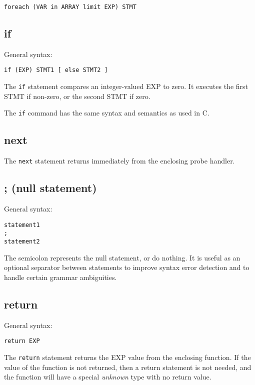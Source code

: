 \documentclass[twoside,english]{article}
\newenvironment{vindent}
{\begin{list}{}{\setlength{\listparindent}{6pt}}
\item[]}
{\end{list}}
\begin{document}
\begin{vindent}
\begin{verbatim}
foreach (VAR in ARRAY limit EXP) STMT
\end{verbatim}
\end{vindent}

\subsection{if}
General syntax:

\begin{vindent}
\begin{verbatim}
if (EXP) STMT1 [ else STMT2 ]
\end{verbatim}
\end{vindent}
The \texttt{if} statement compares an integer-valued EXP to zero. It executes
the first STMT if non-zero, or the second STMT if zero.

The \texttt{if} command has the same syntax and semantics as used in C.


\subsection{next}
The \texttt{next} statement returns immediately from the enclosing probe
handler.


\subsection{; (null statement)}
\index{;}
General syntax:

\begin{vindent}
\begin{verbatim}
statement1
;
statement2
\end{verbatim}
\end{vindent}
The semicolon represents the null statement, or do nothing. It is useful
as an optional separator between statements to improve syntax error detection
and to handle certain grammar ambiguities.


\subsection{return}
General syntax:

\begin{vindent}
\begin{verbatim}
return EXP
\end{verbatim}
\end{vindent}
The \texttt{return} statement returns the EXP value from the enclosing function.
If the value of the function is not returned, then a return statement is
not needed, and the function will have a special \emph{unknown} type with
no return value.
\end{document}
